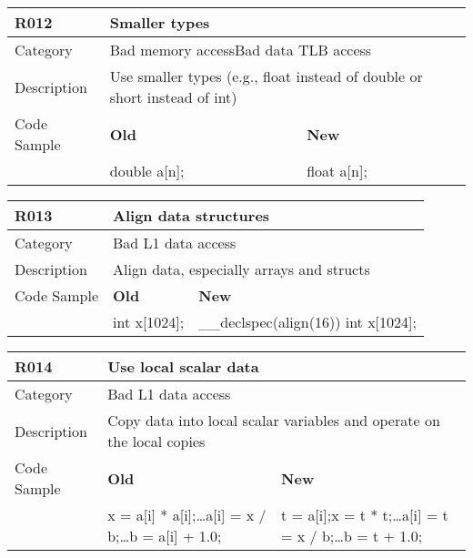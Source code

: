 \begin{tabular}{|p{0.9in}|p{2.0in}|p{2.0in}|} \hline
\textbf{R012}       & \multicolumn{2}{|p{4.0in}|}{\textbf{Smaller types}} \\ \hline
Category            & \multicolumn{2}{|p{4.0in}|}{Bad memory access\newline Bad data TLB access} \\ \hline
Description         & \multicolumn{2}{|p{4.0in}|}{Use smaller types (e.g., float instead of double or short instead of int)} \\ \hline
Code Sample         & \textbf{Old} & \textbf{New} \\ \hline
                    & double a[n]; & float a[n]; \\ \hline
\end{tabular}

\begin{tabular}{|p{0.9in}|p{2.0in}|p{2.0in}|} \hline
\textbf{R013}       & \multicolumn{2}{|p{4.0in}|}{\textbf{Align data structures}} \\ \hline
Category            & \multicolumn{2}{|p{4.0in}|}{Bad L1 data access} \\ \hline
Description         & \multicolumn{2}{|p{4.0in}|}{Align data, especially arrays and structs} \\ \hline
Code Sample         & \textbf{Old} & \textbf{New} \\ \hline
                    & int x[1024]; & \_\_declspec(align(16)) int x[1024]; \\ \hline
\end{tabular}

\begin{tabular}{|p{0.9in}|p{2.0in}|p{2.0in}|} \hline
\textbf{R014}       & \multicolumn{2}{|p{4.0in}|}{\textbf{Use local scalar data}} \\ \hline
Category            & \multicolumn{2}{|p{4.0in}|}{Bad L1 data access} \\ \hline
Description         & \multicolumn{2}{|p{4.0in}|}{Copy data into local scalar variables and operate on the local copies} \\ \hline
Code Sample         & \textbf{Old} & \textbf{New} \\ \hline
                    & x = a[i] * a[i];\newline \ldots\newline a[i] = x / b;\newline \ldots\newline b = a[i] + 1.0;\newline
                    & t = a[i];\newline x = t * t;\newline \ldots\newline a[i] = t = x / b;\newline \ldots\newline b = t + 1.0; \\ \hline
\end{tabular}

